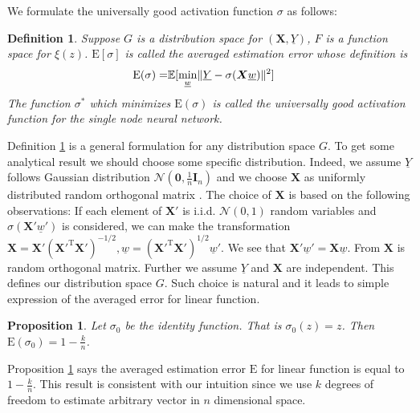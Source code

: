 \documentclass[conference]{IEEEtran}
\newtheorem{definition}{Definition}
\newtheorem{proposition}{Proposition}
\DeclarePairedDelimiter\norm{\lVert}{\rVert}
\def\E{\mathbb{E}}
\def\T{\mathrm{T}}
\begin{document}
We formulate the universally good activation function $\sigma$ as follows:
\begin{definition}\label{def:ug}
Suppose $G$ is a distribution space for $(\bm{X}, \underline{Y})$,
$F$ is a function space for $\xi(z)$.
$\mathrm{E}[\sigma]$ is called the averaged estimation error whose definition is
\begin{align}\label{eq:ug}
\mathrm{E}(\sigma) = & \E[ \min_{\underline{w}} \norm{\underline{Y} - \sigma(\bm{X} \underline{w})}^2] 
\end{align}
The function $\sigma^*$ which minimizes $\mathrm{E}(\sigma)$
is called the universally good activation function for the single node neural network.
\end{definition}

Definition \ref{def:ug} is a general formulation for any distribution space $G$.
To get some analytical result we should choose some specific distribution.
Indeed, we assume $\underline{Y}$ follows Gaussian distribution $\mathcal{N}(\mathbf{0},\frac{1}{n} \mathbf{I}_n)$ and
we choose $\bm{X}$ as uniformly distributed random orthogonal matrix \cite{eaton1989group}. The choice of $\bm{X}$ is based on the following observations: If each element of $\bm{X}'$ is i.i.d. $\mathcal{N}(0, 1)$ random variables and $\sigma(\bm{X}'\underline{w}')$ is considered, we can make the transformation $\bm{X} = \bm{X}'(\bm{X}'^\T\bm{X}')^{-1/2}, \underline{w} = (\bm{X}'^\T\bm{X}')^{1/2}\underline{w}'$. We see that $\bm{X}'\underline{w}' = \bm{X}\underline{w}$. From \cite[Proposition 7.1]{eaton1989group} $\bm{X}$ is random orthogonal matrix.
Further we assume $\underline{Y}$ and $\bm{X}$ are independent.
This defines our distribution space $G$. Such choice is natural and it leads to simple expression of the averaged error for linear function.

\begin{proposition}\label{prop:linear}
Let $\sigma_0$ be the identity function. That is $\sigma_0(z) = z$. Then $\mathrm{E}(\sigma_0) = 1 - \frac{k}{n}$.\end{proposition}

Proposition \ref{prop:linear} says the averaged estimation error $\mathrm{E}$ for linear function is equal to $1-\frac{k}{n}$.
This result is consistent with our intuition
since we use $k$ degrees of freedom to estimate arbitrary vector in $n$ dimensional space.
\end{document}
